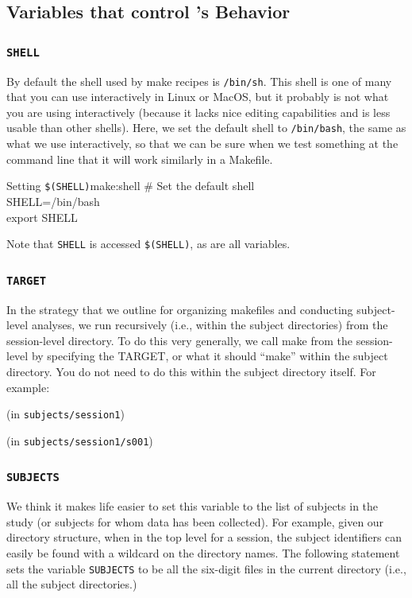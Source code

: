 \subsection{Variables that control \maken's Behavior}

\subsubsection{\texttt{SHELL}}
By default the shell used by make recipes is \texttt{/bin/sh}.  This shell is one of many that you can use interactively in Linux or MacOS, but it probably is not what you are using interactively (because it lacks nice editing capabilities and is less usable than other shells). Here, we set the default shell to \texttt{/bin/bash}, the same as what we use interactively, so that we can be sure when we test something at the command line that it will work similarly in a Makefile.

\begin{make}{Setting \texttt{\$(SHELL)}}{make:shell}
	\# Set the default shell \\
	SHELL=/bin/bash \\
	export SHELL
\end{make}

Note that \texttt{SHELL} is accessed \texttt{\$(SHELL)}, as are all \maken{} variables. 

\subsubsection{\texttt{TARGET}}
In the strategy that we outline for organizing makefiles and conducting subject-level analyses, we run \maken{} recursively (i.e., within the subject directories) from the session-level directory. To do this very generally, we call make from the session-level by specifying the TARGET, or what it should ``make'' within the subject directory. You do not need to do this within the subject directory itself. For example:

(in \texttt{subjects/session1})

(in \texttt{subjects/session1/s001})

\subsubsection{\texttt{SUBJECTS}}
We think it makes life easier to set this variable to the list of subjects in the study (or subjects for whom data has been collected). For example, given our directory structure, when in the top level for a session, the subject identifiers can easily be found with a wildcard on the directory names. The following statement sets the variable \texttt{SUBJECTS} to be all the six-digit files in the current directory (i.e., all the subject directories.) 

